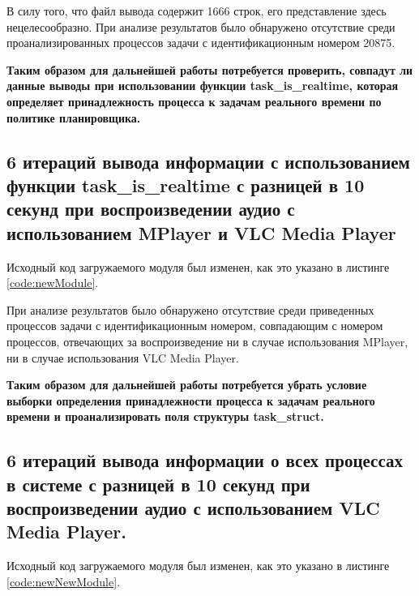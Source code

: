 В силу того, что файл вывода содержит 1666 строк, его представление здесь нецелесообразно. При анализе результатов было обнаружено отсутствие среди проанализированных процессов задачи с идентификационным номером 20875.

\textbf{Таким образом для дальнейшей работы потребуется проверить, совпадут ли данные выводы при использовании функции task\_is\_realtime, которая определяет принадлежность процесса к задачам реального времени по политике планировщика.}

\subsection{6 итераций вывода информации с использованием функции task\_is\_realtime с разницей в 10 секунд при воспроизведении аудио с использованием MPlayer и VLC Media Player}
Исходный код загружаемого модуля был изменен, как это указано в листинге \ref{code:newModule}.


При анализе результатов было обнаружено отсутствие среди приведенных процессов задачи с идентификационным номером, совпадающим с номером процессов, отвечающих за воспроизведение ни в случае использования MPlayer, ни в случае использования VLC Media Player.

\textbf{Таким образом для дальнейшей работы потребуется убрать условие выборки определения принадлежности процесса к задачам реального времени и проанализировать поля структуры task\_struct. }

\subsection{6 итераций вывода информации о всех процессах в системе с разницей в 10 секунд при воспроизведении аудио с использованием VLC Media Player. }
Исходный код загружаемого модуля был изменен, как это указано в листинге \ref{code:newNewModule}.


